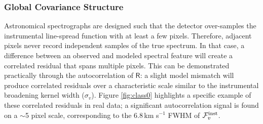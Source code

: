 \documentclass[iop,floatfix,twocolappendix]{emulateapj}
\newcommand{\vR}{\mathsf{R}}
\begin{document}
\subsubsection{Global Covariance Structure} \label{subsec:global_covariance}

Astronomical spectrographs are designed such that the detector over-samples the instrumental 
line-spread function with at least a few pixels.  Therefore, adjacent pixels never record 
independent samples of the true spectrum.  In that case, a difference between an observed and 
modeled spectral feature will create a correlated residual that spans multiple pixels.  This can be 
demonstrated practically through the autocorrelation of $\vR$: a slight model mismatch will produce 
correlated residuals over a characteristic scale similar to the instrumental broadening kernel 
width ($\sigma_v$).  Figure \ref{fig:class0} highlights a specific example of these correlated 
residuals in real data; a significant autocorrelation signal is found on a $\sim$5 pixel scale, 
corresponding to the 6.8\,km s$^{-1}$ FWHM of $\mathcal{F}_v^{\rm inst}$.  
\end{document}
